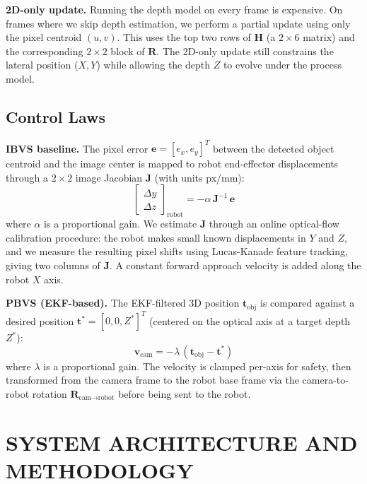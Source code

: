 \documentclass[letterpaper, 10 pt, conference]{ieeeconf}  %
\begin{document}
\textbf{2D-only update.}
Running the depth model on every frame is expensive. On frames where we skip depth estimation, we perform a partial update using only the pixel centroid $(u, v)$. This uses the top two rows of $\mathbf{H}$ (a $2 \times 6$ matrix) and the corresponding $2 \times 2$ block of $\mathbf{R}$. The 2D-only update still constrains the lateral position ($X, Y$) while allowing the depth $Z$ to evolve under the process model.

\subsection{Control Laws}

\textbf{IBVS baseline.}
The pixel error $\mathbf{e} = [e_x, e_y]^T$ between the detected object centroid and the image center is mapped to robot end-effector displacements through a $2 \times 2$ image Jacobian $\mathbf{J}$ (with units px/mm):
\begin{equation}
\begin{bmatrix} \Delta y \\ \Delta z \end{bmatrix}_{\text{robot}} = -\alpha \, \mathbf{J}^{-1} \, \mathbf{e}
\end{equation}
where $\alpha$ is a proportional gain. We estimate $\mathbf{J}$ through an online optical-flow calibration procedure: the robot makes small known displacements in $Y$ and $Z$, and we measure the resulting pixel shifts using Lucas-Kanade feature tracking, giving two columns of $\mathbf{J}$. A constant forward approach velocity is added along the robot $X$ axis.

\textbf{PBVS (EKF-based).}
The EKF-filtered 3D position $\mathbf{t}_{\text{obj}}$ is compared against a desired position $\mathbf{t}^* = [0, 0, Z^*]^T$ (centered on the optical axis at a target depth $Z^*$):
\begin{equation}
\mathbf{v}_{\text{cam}} = -\lambda \, (\mathbf{t}_{\text{obj}} - \mathbf{t}^*)
\label{eq:pbvs}
\end{equation}
where $\lambda$ is a proportional gain. The velocity is clamped per-axis for safety, then transformed from the camera frame to the robot base frame via the camera-to-robot rotation $\mathbf{R}_{\text{cam} \to \text{robot}}$ before being sent to the robot.


\section{SYSTEM ARCHITECTURE AND METHODOLOGY}
\end{document}
